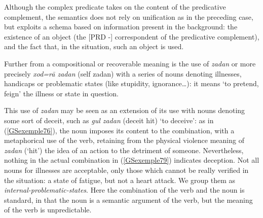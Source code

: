 \documentclass[output=paper]{langsci/langscibook}
\begin{document}
{Although the complex predicate takes on the content of the predicative complement, the semantics does not rely on unification as in the preceding case, but exploits a schema based on information present in the background: the existence of an object (the [PRD -] correspondent of the predicative complement), and the fact that, in the situation, such an object is used.  

Further from a compositional or recoverable meaning is the use of \textit{zadan} or more precisely \textit{xod=r\=a zadan} (self zadan) with a series of nouns denoting illnesses, handicaps or problematic states (like stupidity, ignorance…): it means `to pretend, feign' the illness or state in question.

\begin{exe}
	\label{GSexemple79}
\end{exe}

This use of \textit{zadan} may be seen as an extension of its use with nouns denoting some sort of deceit, such as \textit{gul zadan} (deceit hit) `to deceive’: as in (\ref{GSexemple76}), the noun imposes its content to the combination, with a metaphorical use of the verb, retaining from the physical violence meaning of \textit{zadan} (`hit’) the idea of an action to the detriment of someone. Nevertheless, nothing in the actual combination in (\ref{GSexemple79}) indicates deception. Not all nouns for illnesses are acceptable, only those which cannot be really verified in the situation: a state of fatigue, but not a heart attack. We group them as \textit{internal-problematic-states}. Here the combination of the verb and the noun is standard, in that the noun is a semantic argument of the verb, but the meaning of the verb is unpredictable.

}
\end{document}
